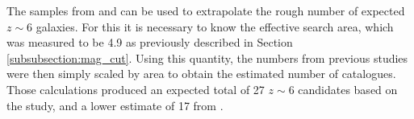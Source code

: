
The samples from \cite{2015MNRAS.452.1817B} and \cite{2013AJ....145....4W} can be used to extrapolate the rough number of expected \DESVIDEO $z\sim6$ galaxies. For this it is necessary to know the effective search area, which was measured to be \SI{4.9}{\sqdeg} as previously described in Section \ref{subsubsection:mag_cut}. Using this quantity, the numbers from previous studies were then simply scaled by area to obtain the estimated number of \DESVIDEO catalogues. Those calculations produced an expected total of 27 $z\sim6$ candidates based on the \cite{2015MNRAS.452.1817B} study, and a lower estimate of 17 from \cite{2013AJ....145....4W}. \par



